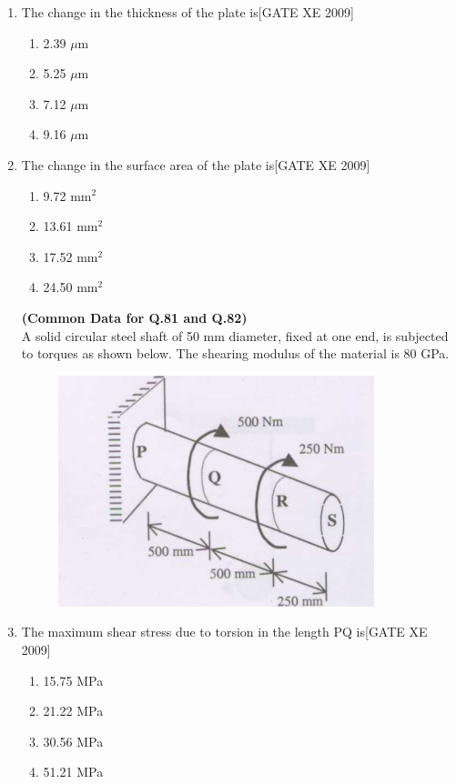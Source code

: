 \documentclass[journal,12pt,onecolumn]{IEEEtran}
\theoremstyle{remark}
\begin{document}
\begin{enumerate}
     \item The change in the thickness of the plate is\hfill[GATE XE 2009]
\begin{multicols}{2}
\begin{enumerate}
    \item 2.39 $\mu$m
    \item 5.25 $\mu$m
    \item 7.12 $\mu$m
    \item 9.16 $\mu$m

\end{enumerate}
\end{multicols}

\item The change in the surface area of the plate is\hfill[GATE XE 2009]
\begin{multicols}{2}
\begin{enumerate}
    \item 9.72 mm$^2$
    \item 13.61 mm$^2$
    \item 17.52 mm$^2$
    \item 24.50 mm$^2$
\end{enumerate}
\end{multicols}




  
\textbf{(Common Data for Q.81 and Q.82)}  \\
A solid circular steel shaft of 50 mm diameter, fixed at one end, is subjected to torques as shown below. The shearing modulus of the material is 80 GPa. \\


   \begin{figure}[H]
        \centering
        \includegraphics[width=0.5\linewidth]{figs/fig25.png}
        \caption*{}
        \label{fig:Q 81 82}
    \end{figure} 
    
  


\item The maximum shear stress due to torsion in the length PQ is\hfill[GATE XE 2009]
\begin{multicols}{2}
\begin{enumerate}
    \item 15.75 MPa
    \item 21.22 MPa
    \item 30.56 MPa
    \item 51.21 MPa
\end{enumerate}
\end{multicols}


\end{enumerate}
\end{document}
